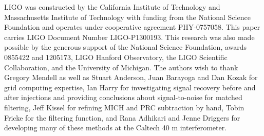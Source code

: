 
LIGO was constructed by the California Institute of Technology and Massachusetts Institute of Technology with funding from the National Science Foundation and operates under cooperative agreement PHY-0757058. This paper carries LIGO Document Number LIGO-P1300193. This research was also made possible by the generous support of the National Science Foundation, awards 0855422 and 1205173, LIGO Hanford Observatory, the LIGO Scientific Collaboration, and the University of Michigan. The authors wish to thank Gregory Mendell as well as Stuart Anderson, Juan Barayoga and Dan Kozak for grid computing expertise, Ian Harry for investigating signal recovery before and after injections and providing conclusions about signal-to-noise for matched filtering, Jeff Kissel for refining MICH and PRC subtraction by hand, Tobin Fricke for the filtering function, and Rana Adhikari and Jenne Driggers for developing many of these methods at the Caltech 40 m interferometer.



%
%

%

